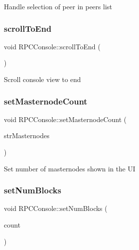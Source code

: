 Handle selection of peer in peers list \mbox{\label{class_r_p_c_console_aaea18a980de27ecf7d358158d44887d2}} 
\subsubsection{\texorpdfstring{scrollToEnd}{scrollToEnd}}
{\footnotesize\ttfamily void R\+P\+C\+Console\+::scroll\+To\+End (\begin{DoxyParamCaption}{ }\end{DoxyParamCaption})\hspace{0.3cm}{\ttfamily [slot]}}

Scroll console view to end \mbox{\label{class_r_p_c_console_a23a841c2142f7ac49506099334135cf5}} 
\subsubsection{\texorpdfstring{setMasternodeCount}{setMasternodeCount}}
{\footnotesize\ttfamily void R\+P\+C\+Console\+::set\+Masternode\+Count (\begin{DoxyParamCaption}\item[{const Q\+String \&}]{str\+Masternodes }\end{DoxyParamCaption})\hspace{0.3cm}{\ttfamily [slot]}}

Set number of masternodes shown in the UI \mbox{\label{class_r_p_c_console_a98b7e85774a91d77c3b01276bd41bc51}} 
\subsubsection{\texorpdfstring{setNumBlocks}{setNumBlocks}}
{\footnotesize\ttfamily void R\+P\+C\+Console\+::set\+Num\+Blocks (\begin{DoxyParamCaption}\item[{int}]{count }\end{DoxyParamCaption})\hspace{0.3cm}{\ttfamily [slot]}}

